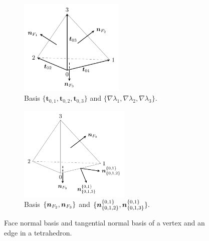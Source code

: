 \begin{figure}[htbp]
  \centering
  \begin{subfigure}{0.49\textwidth} %
  \centering
    \includegraphics[width=5cm]{figures/Tbasis.pdf}
    \caption{Basis $\{\boldsymbol{t}_{0,1}, \boldsymbol{t}_{0,2}, \boldsymbol{t}_{0,3}\}$ and $\{\nabla \lambda_1, \nabla \lambda_2, \nabla \lambda_3\}$.}
  \end{subfigure}
  \hfill %
  \begin{subfigure}{0.49\textwidth}
  \centering
    \includegraphics[width=5.3cm]{figures/Tedgebasis.pdf}
    \caption{Basis $\{\boldsymbol n_{F_2}, \boldsymbol n_{F_3}\}$ and $\{ \boldsymbol n^{\{0,1\}}_{\{0,1,2\}}, \boldsymbol n^{\{0,1\}}_{\{0,1,3\}}\}.$}
  \end{subfigure}
  \caption{Face normal basis and tangential normal basis of a vertex and an edge in a tetrahedron.}\label{fig:lagrange2dk45}
\end{figure}








